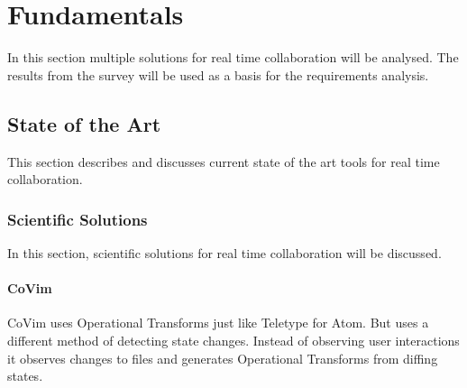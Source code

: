 \chapter{Fundamentals}
\label{sec:fundamentals}

In this section multiple solutions for real time collaboration will be analysed. 
The results from the survey will be used as a basis for the requirements analysis.

\section{State of the Art}
\label{sec:stateoftheart}

This section describes and discusses current state of the art tools for real time collaboration.

\subsection{Scientific Solutions}

In this section, scientific solutions for real time collaboration will be discussed.

\subsubsection{CoVim}
CoVim \cite{ChoNgSun:2017:CoVim:Incorporatingreal-timecollaborationcapabilitiesintocomprehensivetexteditors} uses Operational Transforms just like Teletype for Atom. But uses a different method of detecting state changes. Instead of observing user interactions it observes changes to files and generates Operational Transforms from diffing states.

